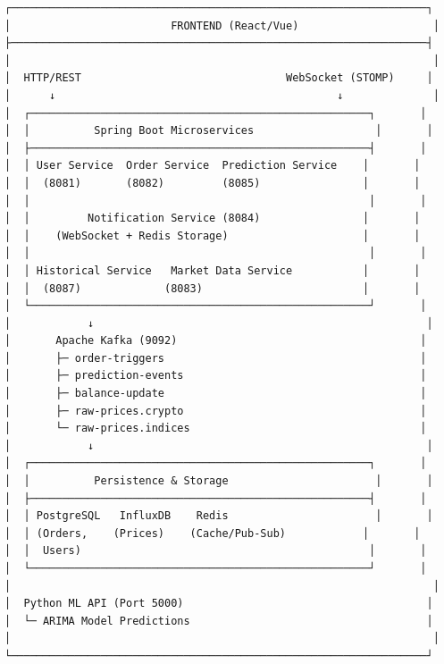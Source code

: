 \documentclass[12pt,a4paper,twoside]{report}
\begin{document}
\begin{verbatim}
┌─────────────────────────────────────────────────────────────────┐
│                         FRONTEND (React/Vue)                     │
├─────────────────────────────────────────────────────────────────┤
│                                                                  │
│  HTTP/REST                                WebSocket (STOMP)     │
│      ↓                                            ↓              │
│  ┌─────────────────────────────────────────────────────┐       │
│  │          Spring Boot Microservices                   │       │
│  ├─────────────────────────────────────────────────────┤       │
│  │ User Service  Order Service  Prediction Service    │       │
│  │  (8081)       (8082)         (8085)                │       │
│  │                                                     │       │
│  │         Notification Service (8084)                │       │
│  │    (WebSocket + Redis Storage)                     │       │
│  │                                                     │       │
│  │ Historical Service   Market Data Service           │       │
│  │  (8087)             (8083)                         │       │
│  └─────────────────────────────────────────────────────┘       │
│            ↓                                                    │
│       Apache Kafka (9092)                                      │
│       ├─ order-triggers                                        │
│       ├─ prediction-events                                     │
│       ├─ balance-update                                        │
│       ├─ raw-prices.crypto                                     │
│       └─ raw-prices.indices                                    │
│            ↓                                                    │
│  ┌─────────────────────────────────────────────────────┐       │
│  │          Persistence & Storage                       │       │
│  ├─────────────────────────────────────────────────────┤       │
│  │ PostgreSQL   InfluxDB    Redis                       │       │
│  │ (Orders,    (Prices)    (Cache/Pub-Sub)            │       │
│  │  Users)                                             │       │
│  └─────────────────────────────────────────────────────┘       │
│                                                                  │
│  Python ML API (Port 5000)                                      │
│  └─ ARIMA Model Predictions                                     │
│                                                                  │
└─────────────────────────────────────────────────────────────────┘
\end{verbatim}
\end{document}
